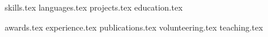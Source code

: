 \documentclass[letterpaper,11pt]{article}
\begin{document}


\sidebyside
    {{skills.tex}}
    {{languages.tex}}
{projects.tex}
{education.tex}

\pagebreak

{awards.tex}
{experience.tex}
{publications.tex}
{volunteering.tex}
{teaching.tex}
\end{document}
